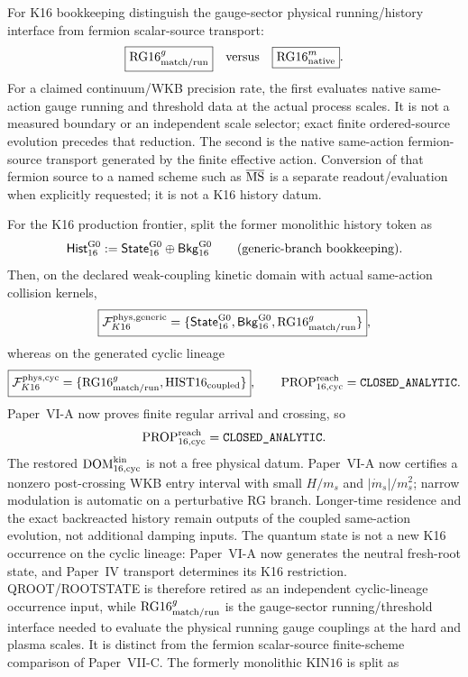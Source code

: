 \documentclass[12pt,a4paper]{article}
\begin{document}
\begin{remark}
For K16 bookkeeping distinguish the gauge-sector physical running/history
interface from fermion scalar-source transport:
\[
 \boxed{\mathrm{RG16}^{g}_{\rm match/run}}
 \quad\hbox{versus}\quad
 \boxed{\mathrm{RG16}^{m}_{\rm native}}.
\]
For a claimed continuum/WKB precision rate, the first evaluates native
same-action gauge running and threshold data at the actual process scales.
It is not a measured boundary or an independent scale selector; exact finite
ordered-source evolution precedes that reduction.
The second is the native same-action fermion-source transport generated by the
finite effective action.  Conversion of that fermion source to a named scheme
such as $\overline{\rm MS}$ is a separate readout/evaluation when explicitly
requested; it is not a K16 history datum.

For the K16 production frontier, split the former monolithic history token as
\[
 \mathsf{Hist}^{\rm G0}_{16}
 :=\mathsf{State}^{\rm G0}_{16}\oplus\mathsf{Bkg}^{\rm G0}_{16}
 \qquad\text{(generic-branch bookkeeping)}.
\]
Then, on the declared weak-coupling kinetic domain with actual
same-action collision kernels,
\[
 \boxed{\mathcal F_{K16}^{\rm phys,generic}
 =\{\mathsf{State}^{\rm G0}_{16},\mathsf{Bkg}^{\rm G0}_{16},
       \mathrm{RG16}^{g}_{\rm match/run}\}},
\]
whereas on the generated cyclic lineage
\[
 \boxed{\mathcal F_{K16}^{\rm phys,cyc}
 =\{\mathrm{RG16}^{g}_{\rm match/run},
       \mathrm{HIST16}_{\rm coupled}\}},\qquad
 \mathrm{PROP}^{\rm reach}_{16,\rm cyc}=\texttt{CLOSED\_ANALYTIC}.
\]
Paper~VI-A now proves finite regular arrival and crossing, so
\[
\mathrm{PROP}^{\rm reach}_{16,\rm cyc}=\texttt{CLOSED\_ANALYTIC}.
\]
The restored \(\mathrm{DOM}^{\rm kin}_{16,\rm cyc}\) is not a free
physical datum.  Paper~VI-A now certifies a nonzero post-crossing WKB entry
interval with small $H/m_s$ and $|\dot m_s|/m_s^2$; narrow modulation is
automatic on a perturbative RG branch.  Longer-time residence and the exact
backreacted history remain outputs of the coupled same-action evolution, not
additional damping inputs.  The quantum state is not a new K16 occurrence on the cyclic lineage: Paper~VI-A now generates the neutral fresh-root state, and Paper~IV transport determines its K16 restriction.  QROOT/ROOTSTATE is therefore retired as an independent cyclic-lineage occurrence input, while \(\mathrm{RG16}^{g}_{\rm match/run}\) is the gauge-sector running/threshold interface needed to evaluate the physical running gauge couplings at
the hard and plasma scales.  It is distinct from the fermion scalar-source
finite-scheme comparison of Paper~VII-C.  The formerly monolithic \(\mathrm{KIN16}\) is split as

\end{remark}
\end{document}
